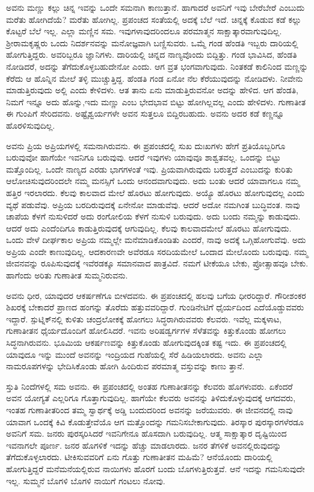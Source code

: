 ಅವನು ಮಣ್ಣು ಕಲ್ಲು ಚಿನ್ನ ಇವನ್ನು ಒಂದೇ ಸಮನಾಗಿ ಕಾಣುತ್ತಾನೆ. ಹಾಗಾದರೆ ಅವನಿಗೆ ಇವು ಬೇರೆಬೇರೆ ಎಂಬುದು ಮರೆತು ಹೋಗಿದೆಯೆ? ಮರೆತು ಹೋಗಿಲ್ಲ. ಪ್ರಪಂಚದ ಸಂತೆಯಲ್ಲಿ ಅದಕ್ಕೆ ಬೆಲೆ ಇದೆ. ಚಿನ್ನಕ್ಕೆ ಕೊಡುವ ಕಡೆ ಕಲ್ಲು ಕೊಟ್ಟರೆ ಬೆಲೆ ಇಲ್ಲ. ಎಲ್ಲಾ ಮಣ್ಣಿನ ಸಮ. ಇವುಗಳಾವುದರಿಂದಲೂ ಪರಮಾತ್ಮನ ಸಾಕ್ಷಾತ್ಕಾರವಾಗುವುದಿಲ್ಲ. ಶ‍್ರೀರಾಮಕೃಷ್ಣರು ಒಂದು ನಿದರ್ಶನವನ್ನು ಮನೋಜ್ಞವಾಗಿ ಬಣ್ಣಿಸುವರು. ಒಮ್ಮೆ ಗಂಡ ಹೆಂಡತಿ ಇಬ್ಬರು ದಾರಿಯಲ್ಲಿ ಹೋಗುತ್ತಿದ್ದರು. ಅವರಿಬ್ಬರೂ ಜ್ಞಾನಿಗಳು. ದಾರಿಯಲ್ಲಿ ಚಿನ್ನದ ನಾಣ್ಯವೊಂದು ಬಿದ್ದಿತ್ತು. ಗಂಡ ಭಾವಿಸಿದ, ಹೆಂಡತಿ ನೋಡಿದರೆ, ಅದನ್ನು ತೆಗೆದುಕೊಳ್ಳಬಹುದೇನೋ ಎಂದು. ಆಗ ವ್ರತ ಭಂಗವಾಗುವುದು. ನಿಂತಕಡೆ ಕಾಲಿನಿಂದ ಮಣ್ಣನ್ನು ಕೆರೆದು ಆ ಹೊನ್ನಿನ ಮೇಲೆ ತಳ್ಳಿ ಮುಚ್ಚುತ್ತಿದ್ದ. ಹೆಂಡತಿ ಗಂಡ ಏನೋ ನೆಲ ಕೆರೆಯುವುದನ್ನು ನೋಡಿದಳು. ನೀವೇನು ಮಾಡುತ್ತಿರುವುದು ಅಲ್ಲಿ ಎಂದು ಕೇಳಿದಳು. ಆತ ತಾನು ಏನು ಮಾಡುತ್ತಿರುವನೋ ಅದನ್ನು ಹೇಳಿದ. ಆಗ ಹೆಂಡತಿ, ನಿಮಗೆ ಇನ್ನೂ ಅದು ಹೊನ್ನು,ಇದು ಮಣ್ಣು ಎಂಬ ಭೇದಭಾವ ಬಿಟ್ಟು ಹೋಗಿಲ್ಲವಲ್ಲ ಎಂದು ಹೇಳಿದಳು. ಗುಣಾತೀತ ಈ ಗುಂಪಿಗೆ ಸೇರಿದವನು. ಅಷ್ಟೈಶ್ವರ್ಯಗಳೇ ಅವನ ಸುತ್ತಲೂ ಬಿದ್ದಿರಬಹುದು. ಅವನು ಅದರ ಕಡೆ ಕಣ್ಣನ್ನೂ ಹೊರಳಿಸುವುದಿಲ್ಲ.

ಅವನು ಪ್ರಿಯ ಅಪ್ರಿಯಗಳಲ್ಲಿ ಸಮನಾಗಿರುವನು. ಈ ಪ್ರಪಂಚದಲ್ಲಿ ಸುಖ ದುಃಖಗಳು ಹೇಗೆ ಪ್ರತಿಯೊಬ್ಬರಿಗೂ ಬರುವುವೋ ಹಾಗೆಯೇ ಇವನಿಗೂ ಬರುವುವು. ಆದರೆ ಇವುಗಳು ಯಾವುವೂ ಶಾಶ್ವತವಲ್ಲ. ಒಂದನ್ನು ಬಿಟ್ಟು ಮತ್ತೊಂದಿಲ್ಲ. ಒಂದೇ ನಾಣ್ಯದ ಎರಡು ಭಾಗಗಳಂತೆ ಇವು. ಪ್ರಿಯವಾಗಿರುವುದು ಬರುತ್ತದೆ ಎಂಬುದನ್ನು ಕುರಿತು ಆಲೋಚಿಸುವುದರಿಂದಲೇ ನಮ್ಮ ಮನಸ್ಸಿಗೆ ಒಂದು ಆನಂದವಾಗುವುದು. ಅದು ಬಂತು ಆದರೆ ಯಾವಾಗಲೂ ನಮ್ಮ ಹತ್ತಿರ ಇರಲಾರದು. ಕೆಲವು ಕಾಲವಾದ ಮೇಲೆ ಹೊರಟು ಹೋಗುವುದು. ಅಯ್ಯೊ ಹೊರಟು ಹೋಗುವುದಲ್ಲ ಎಂದು ವ್ಯಥೆ ಪಡುವೆವು. ಅಪ್ರಿಯ ಬರದಿರುವುದಕ್ಕೆ ಏನೇನೋ ಮಾಡುವೆವು. ಆದರೆ ಅದೋ ನಮಗಿಂತ ಬುದ್ಧಿವಂತ. ನಾವು ಚಾಪೆಯ ಕೆಳಗೆ ನುಸುಳಿದರೆ ಅದು ರಂಗೋಲಿಯ ಕೆಳಗೆ ನುಸುಳಿ ಬರುವುದು. ಅದು ಬಂದು ನಮ್ಮನ್ನು ಕಾಡುವುದು. ಆದರೆ ಅದು ಎಂದೆಂದಿಗೂ ಕಾಡುತ್ತಿರುವುದಕ್ಕೆ ಆಗುವುದಿಲ್ಲ. ಕೆಲವು ಕಾಲವಾದಮೇಲೆ ಹೊರಟು ಹೋಗುವುದು. ಒಂದು ವೇಳೆ ದೀರ್ಘಕಾಲ ಅಪ್ರಿಯ ನಮ್ಮಲ್ಲೇ ಮನೆಮಾಡಿಕೊಂಡಿತು ಎಂದರೆ, ನಾವು ಅದಕ್ಕೆ ಒಗ್ಗಿಹೋಗುವೆವು. ಅದು ಅಪ್ರಿಯ ಎಂದೇ ಕಾಣುವುದಿಲ್ಲ. ಆದಕಾರಣವೇ ಅವೆರಡೂ ಸರದಿಯಮೇಲೆ ಒಂದಾದ ಮೇಲೊಂದು ಬರುವುವು. ನಮ್ಮ ಜೀವನವನ್ನು ರೂಪಿಸುವುದಕ್ಕೆ ಇವೆರಡಕ್ಕೂ ಸಮಾನವಾದ ಪಾತ್ರವಿದೆ. ನಮಗೆ ಟೀಕೆಯೂ ಬೇಕು, ಪ್ರೋತ್ಸಾಹವೂ ಬೇಕು. ಹಾಗೆಂದು ಅರಿತು ಗುಣಾತೀತ ಸುಮ್ಮನಿರುವನು.

ಅವನು ಧೀರ, ಯಾವುದರ ಆಕರ್ಷಣೆಗೂ ಬೀಳದವನು. ಈ ಪ್ರಪಂಚದಲ್ಲಿ ಹಲವು ಬಗೆಯ ಧೀರರಿದ್ದಾರೆ. ಗೌರೀಶಂಕರ ಶಿಖರಕ್ಕೆ ಬೇಕಾದರೆ ಪ್ರಾಣದ ಹಂಗನ್ನು ತೊರೆದು ಹತ್ತುವವರಿದ್ದಾರೆ. ಗುಂಡಿನೇಟಿಗೆ ಧೈರ್ಯದಿಂದ ಎದೆಯೊಡ್ಡುವವರು ಇದ್ದಾರೆ. ಸ್ಪುಟ್ನಿಕ್​ನಲ್ಲಿ ಕುಳಿತು ಚಂದ್ರಲೋಕಕ್ಕೆ ಹೋಗಲು ಸಿದ್ಧರಾಗಿರುವವರು ಕೆಲವರು. ಇವೆಲ್ಲ ಮಕ್ಕಳಾಟ, ಗುಣಾತೀತನ ಧೈರ್ಯದೊಂದಿಗೆ ಹೋಲಿಸಿದರೆ. ಇವನು ಅರಿಷಡ್ವರ್ಗಗಳ ಸೆಳೆತವನ್ನು ಕಿತ್ತುಕೊಂಡು ಹೋಗಲು ಸಿದ್ಧನಾಗಿರುವನು. ಭೂಮಿಯ ಆಕರ್ಷಣವನ್ನು ಕಿತ್ತುಕೊಂಡು ಹೋಗುವುದಕ್ಕಿಂತ ಕಷ್ಟ ಇದು. ಈ ಪ್ರಪಂಚದಲ್ಲಿ ಯಾವುದೂ ಇನ್ನು ಮುಂದೆ ಅವನನ್ನು ಇಂದ್ರಿಯದ ಗುಹೆಯಲ್ಲಿ ಸೆರೆ ಹಿಡಿಯಲಾರದು. ಅವನು ಎಲ್ಲಾ ನಾಮರೂಪಗಳನ್ನು ಭೇದಿಸಿಕೊಂಡು ಹೋಗಿ ಹಿಂದಿರುವ ಪರಮಾತ್ಮ ವಸ್ತುವನ್ನು ಕಾಣು ತ್ತಾನೆ.

ಸ್ತುತಿ ನಿಂದೆಗಳಲ್ಲಿ ಸಮ ಅವನು. ಈ ಪ್ರಪಂಚದಲ್ಲಿ ಅಂತಹ ಗುಣಾತೀತನನ್ನು ಕೆಲವರು ಹೊಗಳುವರು. ಏಕೆಂದರೆ ಅವನ ಯೋಗ್ಯತೆ ಎಲ್ಲರಿಗೂ ಗೊತ್ತಾಗುವುದಿಲ್ಲ. ಹಾಗೆಯೇ ಕೆಲವರು ಅವನನ್ನು ತಿಳಿದುಕೊಳ್ಳುವುದಕ್ಕೆ ಆಗದವರು, ಇಂತಹ ಗುಣಾತೀತರಿಂದ ತಮ್ಮ ಸ್ವಾರ್ಥಕ್ಕೆ ಅಡ್ಡಿ ಬಂದುದರಿಂದ ಅವನನ್ನು ಜರೆಯುವರು. ಈ ಜೀವನದಲ್ಲಿ ನಾವು ಯಾವಾಗ ಒಂದಕ್ಕೆ ಕಿವಿ ಕೊಡುತ್ತೇವೆಯೊ ಆಗ ಮತ್ತೊಂದನ್ನು ಗಮನಿಸಬೇಕಾಗುವುದು. ತಿರಸ್ಕಾರ ಪುರಸ್ಕಾರಗಳೆರಡೂ ಅವನಿಗೆ ಸಮ. ಜನರು ಪುರಸ್ಕರಿಸಿದರೆ ಇವನಿಗೇನೂ ಹೊಸದಾಗಿ ಬರುವುದಿಲ್ಲ. ಆತ್ಮ ಸಾಕ್ಷಾತ್ಕಾರ ದೃಷ್ಟಿಯಿಂದ ಇವನಾಗಲೇ ಪೂರ್ಣ. ಜನರ ಹೊಗಳಿಕೆ ಇದನ್ನು ಹೆಚ್ಚು ಮಾಡಲಾರದು. ಜನರ ತೆಗಳಿಕೆ ಅವನಲ್ಲಿರುವುದನ್ನು ತೆಗೆದುಕೊಳ್ಳಲಾರದು. ಟೀಕಿಸುವವರಿಗೆ ಏನು ಗೊತ್ತು ಗುಣಾತೀತನ ಮಹಿಮೆ? ಆನೆಯೊಂದು ದಾರಿಯಲ್ಲಿ ಹೋಗುತ್ತಿದ್ದರೆ ಮನೆಮನೆಯಲ್ಲಿರುವ ನಾಯಿಗಳು ಹೊರಗೆ ಬಂದು ಬೊಗಳುತ್ತಿರುತ್ತವೆ. ಆನೆ ಇದನ್ನು ಗಮನಿಸುವುದೇ ಇಲ್ಲ. ಸುಮ್ಮನೆ ಬೊಗಳಿ ಬೊಗಳಿ ನಾಯಿಗೆ ಗಂಟಲು ನೋವು.

